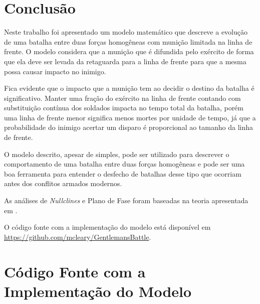 \documentclass{article}
\begin{document}
\section{Conclusão}

Neste trabalho foi apresentado um modelo matemático que descreve a evolução de uma batalha entre duas forças homogêneas com munição limitada na linha de frente. O modelo considera que a munição que é difundida pelo exército de forma que ela deve ser levada da retaguarda para a linha de frente para que a mesma possa causar impacto no inimigo.

Fica evidente que o impacto que a munição tem ao decidir o destino da batalha é significativo. Manter uma fração do exército na linha de frente contando com substituição contínua dos soldados impacta no tempo total da batalha, porém uma linha de frente menor significa menos mortes por unidade de tempo, já que a probabilidade do inimigo acertar um disparo é proporcional ao tamanho da linha de frente.

O modelo descrito, apesar de simples, pode ser utilizado para descrever o comportamento de uma batalha entre duas forças homogêneas e pode ser uma boa ferramenta para entender o desfecho de batalhas desse tipo que ocorriam antes dos conflitos armados modernos.

As análises de \textit{Nullclines} e Plano de Fase foram baseadas na teoria apresentada em \cite{chaos}.

O código fonte com a implementação do modelo está disponível em \url{https://github.com/mcleary/GentlemansBattle}.







\newpage
\appendix
\section{Código Fonte com a Implementação do Modelo}


\end{document}

